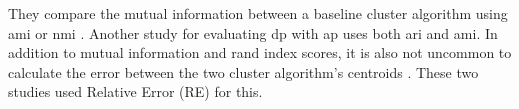 They compare the mutual information between a baseline cluster algorithm using \gls{ami} \citep{9679364} or \gls{nmi} \citep{xia_distributed_2020,sun_privbv_2022}.
Another study for evaluating \gls{dp} with \gls{ap} uses both \gls{ari} and \gls{ami}.
In addition to mutual information and rand index scores, it is also not uncommon to calculate the error between the two cluster algorithm's centroids \citep{xia_distributed_2020, 9679364}.
These two studies used Relative Error (RE) for this.

